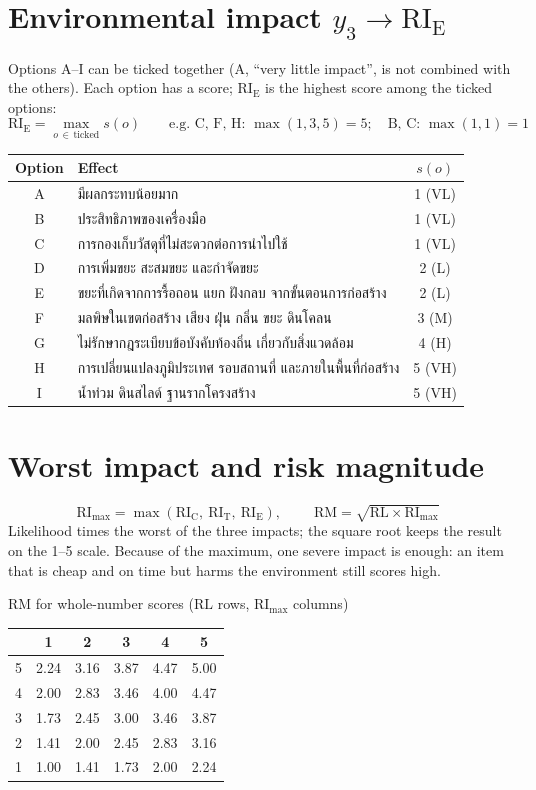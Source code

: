 \documentclass[10pt,a4paper]{article}
\newcommand{\RL}{\mathrm{RL}}\newcommand{\RIC}{\mathrm{RI_C}}\newcommand{\RIT}{\mathrm{RI_T}}\newcommand{\RIE}{\mathrm{RI_E}}
\newcommand{\RImax}{\mathrm{RI}_{\max}}\newcommand{\RM}{\mathrm{RM}}
\begin{document}
\section{Environmental impact \texorpdfstring{$y_3\to\RIE$}{y3 -> RI_E}}
Options A--I can be ticked together (A, ``very little impact'', is not combined with the others). Each option has a score; $\RIE$ is the highest score among the ticked options:
\[ \RIE=\max_{o\,\in\,\text{ticked}} s(o) \qquad\text{e.g. C, F, H: }\max(1,3,5)=5;\quad \text{B, C: }\max(1,1)=1 \]
\begin{tabularx}{\linewidth}{@{}cXc@{}}\toprule
Option & Effect & $s(o)$\\\midrule
A & มีผลกระทบน้อยมาก & 1 (VL)\\ B & ประสิทธิภาพของเครื่องมือ & 1 (VL)\\ C & การกองเก็บวัสดุที่ไม่สะดวกต่อการนำไปใช้ & 1 (VL)\\
D & การเพิ่มขยะ สะสมขยะ และกำจัดขยะ & 2 (L)\\ E & ขยะที่เกิดจากการรื้อถอน แยก ฝังกลบ จากขั้นตอนการก่อสร้าง & 2 (L)\\
F & มลพิษในเขตก่อสร้าง เสียง ฝุ่น กลิ่น ขยะ ดินโคลน & 3 (M)\\ G & ไม่รักษากฎระเบียบข้อบังคับท้องถิ่น เกี่ยวกับสิ่งแวดล้อม & 4 (H)\\
H & การเปลี่ยนแปลงภูมิประเทศ รอบสถานที่ และภายในพื้นที่ก่อสร้าง & 5 (VH)\\ I & น้ำท่วม ดินสไลด์ ฐานรากโครงสร้าง & 5 (VH)\\\bottomrule
\end{tabularx}

\section{Worst impact and risk magnitude}
\[ \RImax=\max(\RIC,\ \RIT,\ \RIE),\qquad \boxed{\;\RM=\sqrt{\RL\times\RImax}\;} \]
Likelihood times the worst of the three impacts; the square root keeps the result on the 1--5 scale. Because of the maximum, one severe impact is enough: an item that is cheap and on time but harms the environment still scores high.

\begin{center}\small
$\RM$ for whole-number scores ($\RL$ rows, $\RImax$ columns)\\[3pt]
\begin{tabular}{c|ccccc}
 & 1 & 2 & 3 & 4 & 5\\\hline
5 & 2.24 & 3.16 & 3.87 & 4.47 & 5.00\\
4 & 2.00 & 2.83 & 3.46 & 4.00 & 4.47\\
3 & 1.73 & 2.45 & 3.00 & 3.46 & 3.87\\
2 & 1.41 & 2.00 & 2.45 & 2.83 & 3.16\\
1 & 1.00 & 1.41 & 1.73 & 2.00 & 2.24
\end{tabular}
\end{center}
\end{document}

